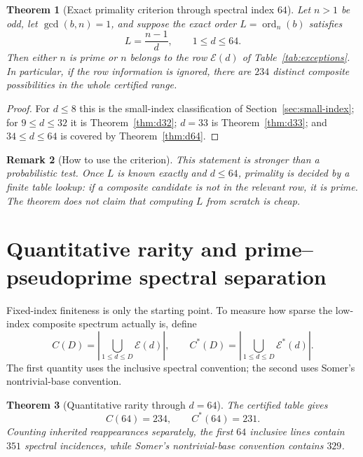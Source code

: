 \documentclass[11pt]{article}
\newtheorem{theorem}{Theorem}[section]
\newtheorem{remark}[theorem]{Remark}
\newcommand{\ord}{\operatorname{ord}}
\newcommand{\Eset}{\mathcal E}
\begin{document}
\begin{theorem}[Exact primality criterion through spectral index $64$]
\label{thm:primality64}
Let $n>1$ be odd, let $\gcd(b,n)=1$, and suppose the exact order $L=\ord_n(b)$
satisfies
\[
L=\frac{n-1}{d},\qquad 1\le d\le64.
\]
Then either $n$ is prime or $n$ belongs to the row $\Eset(d)$ of
Table~\ref{tab:exceptions}.  In particular, if the row information is ignored,
there are $234$ distinct composite possibilities in the whole certified range.
\end{theorem}

\begin{proof}
For $d\le8$ this is the small-index classification of
Section~\ref{sec:small-index}; for $9\le d\le32$ it is
Theorem~\ref{thm:d32}; $d=33$ is Theorem~\ref{thm:d33}; and $34\le d\le64$ is covered by Theorem~\ref{thm:d64}.
\end{proof}

\begin{remark}[How to use the criterion]
This statement is stronger than a probabilistic test.  Once $L$ is known
exactly and $d\le64$, primality is decided by a finite table lookup: if a
composite candidate is not in the relevant row, it is prime.  The theorem does
not claim that computing $L$ from scratch is cheap.
\end{remark}

\section{Quantitative rarity and prime--pseudoprime spectral separation}
\label{sec:rarity}

Fixed-index finiteness is only the starting point.  To measure how sparse the
low-index composite spectrum actually is, define
\[
C(D)=\left|\bigcup_{1\le d\le D}\Eset(d)\right|,
\qquad
C^\ast(D)=\left|\bigcup_{1\le d\le D}\Eset^\ast(d)\right|.
\]
The first quantity uses the inclusive spectral convention; the second uses
Somer's nontrivial-base convention.

\begin{theorem}[Quantitative rarity through $d=64$]
\label{thm:rarity64}
The certified table gives
\[
C(64)=234,\qquad C^\ast(64)=231.
\]
Counting inherited reappearances separately, the first $64$ inclusive lines
contain $351$ spectral incidences, while Somer's nontrivial-base convention
contains $329$.
\end{theorem}
\end{document}
